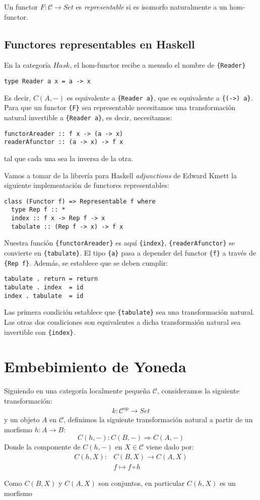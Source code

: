 \documentclass[12pt, twoside]{book}
\newcommand{\code}[1]{\Verb+{#1}+}
\newcommand{\cat}{{\mathcal{C}}}
\newcommand{\Set}{{Set}}
\newcommand{\Hask}{{Hask}}
\begin{document}
\begin{definition}
Un functor $F \colon \cat \to \Set$ es \emph{representable} si es isomorfo naturalmente a un hom-functor.
\end{definition}

\subsection{Functores representables en Haskell}
En la categoría $\Hask$, el hom-functor recibe a menudo el nombre de \code{Reader}
\begin{verbatim}
type Reader a x = a -> x
\end{verbatim}
Es decir, $C(A,-)$ es equivalente a \code{Reader a}, que es equivalente a \code{(->) a}.
Para que un functor \code{F} sea representable necesitamos una transformación natural invertible a \code{Reader a}, es decir, necesitamos:
\begin{verbatim}
functorAreader :: f x -> (a -> x)
readerAfunctor :: (a -> x) -> f x
\end{verbatim}
tal que cada una sea la inversa de la otra.

Vamos a tomar de la librería para Haskell \textit{adjunctions} de Edward Kmett la siguiente implementación de functores representables:
\begin{verbatim}
class (Functor f) => Representable f where
  type Rep f :: *
  index :: f x -> Rep f -> x
  tabulate :: (Rep f -> x) -> f x
\end{verbatim}
Nuestra función \code{functorAreader} es aquí \code{index}, \code{readerAfunctor} se convierte en \code{tabulate}.
El tipo \code{a} pasa a depender del functor \code{f} a través de \code{Rep f}.
Además, se establece que se deben cumplir:
\begin{verbatim}
tabulate . return = return
tabulate . index  = id
index . tabulate  = id
\end{verbatim}
Las primera condición establece que \code{tabulate} sea una transformación natural. 
Las otras dos condiciones son equivalentes a dicha transformaión natural sea invertible con \code{index}.

\section{Embebimiento de Yoneda}
Siguiendo en una categoría localmente pequeña $\cat$, consideramos la siguiente transformación:
\begin{align*}
k \colon \cat^{op} \to \Set
\end{align*} y un objeto $A$ en $\cat$, definimos la siguiente transformación natural a partir de un morfismo $h \colon A \to B$:
\[ C(h,-) \colon C(B,-) \Rightarrow C(A,-) \]
Donde la componente de $C(h,-)$ en $X \in \cat$ viene dado por:
\begin{align*}
C(h,X) \colon & C(B,X) \to C(A,X)\\
& f \mapsto f \circ h
\end{align*}

Como $C(B,X)$ y $C(A,X)$ son conjuntos, en particular $C(h,X)$ es un morfismo 

\backmatter



\end{document}
